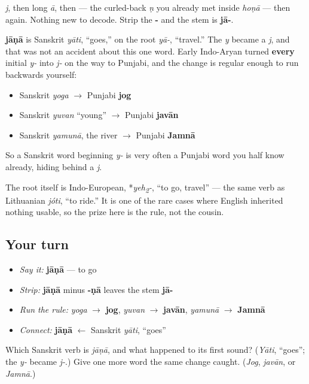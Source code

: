 \textbf{} \emph{j}, then \textbf{} long \emph{ā}, then \textbf{} — the curled-back \emph{ṇ} you already met inside \emph{hoṇā} — then \textbf{} again. Nothing new to decode. Strip the \textbf{-} and the stem is \textbf{jā-}.

\begin{cousinweb}
\textbf{jāṇā} is Sanskrit \emph{yāti}, “goes,” on the root \emph{yā-}, “travel.” The \emph{y} became a \emph{j}, and that was not an accident about this one word. Early Indo-Aryan turned \textbf{every} initial \emph{y-} into \emph{j-} on the way to Punjabi, and the change is regular enough to run backwards yourself:

\begin{itemize}
\raggedright
  \item Sanskrit \emph{yoga} $\to$ Punjabi \textbf{jog}
  \item Sanskrit \emph{yuvan} “young” $\to$ Punjabi \textbf{javān}
  \item Sanskrit \emph{yamunā}, the river $\to$ Punjabi \textbf{Jamnā}
\end{itemize}

So a Sanskrit word beginning \emph{y-} is very often a Punjabi word you half know already, hiding behind a \emph{j}.

The root itself is Indo-European, *\emph{yeh\textsubscript{2}-}, “to go, travel” — the same verb as Lithuanian \emph{jóti}, “to ride.” It is one of the rare cases where English inherited nothing usable, so the prize here is the rule, not the cousin.
\end{cousinweb}

\subsection*{Your turn}
\begin{itemize}
\raggedright
  \item \emph{Say it:} \textbf{jāṇā} — to go
  \item \emph{Strip:} \textbf{jāṇā} minus \textbf{-ṇā} leaves the stem \textbf{jā-}
  \item \emph{Run the rule:} \emph{yoga} $\to$ \textbf{jog}, \emph{yuvan} $\to$ \textbf{javān}, \emph{yamunā} $\to$ \textbf{Jamnā}
  \item \emph{Connect:} \textbf{jāṇā} $\leftarrow$ Sanskrit \emph{yāti}, “goes”
\end{itemize}

\begin{tcolorbox}[breakable,colback=teal!4,colframe=teal!35!black,title={Before you move on}]
Which Sanskrit verb is \emph{jāṇā}, and what happened to its first sound? (\emph{Yāti}, “goes”; the \emph{y-} became \emph{j-}.) Give one more word the same change caught. (\emph{Jog}, \emph{javān}, or \emph{Jamnā}.)
\end{tcolorbox}
